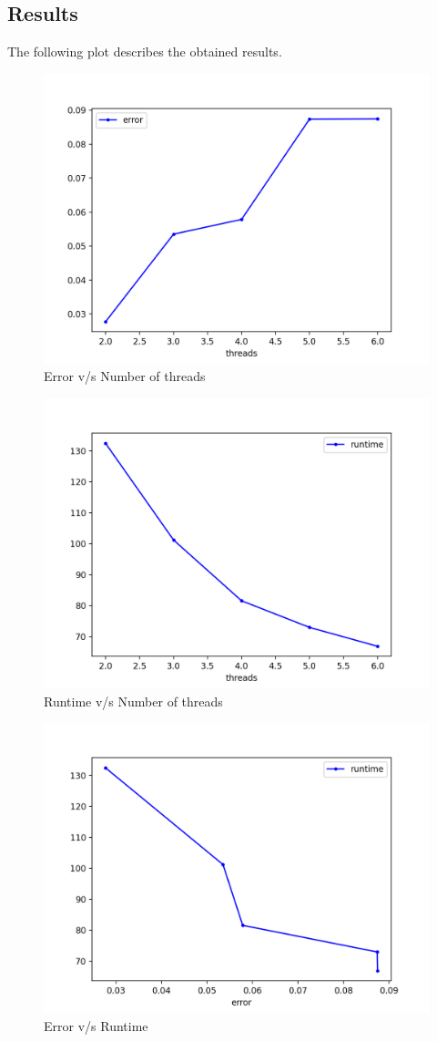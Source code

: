 \documentclass[a4paper]{article}
\begin{document}
\subsection*{Results}
The following plot describes the obtained results.
\begin{figure}[H]
    \centering
    \includegraphics[width=0.5\linewidth]{pthreads-spatial-dynamic-error.png}
    \caption{Error v/s Number of threads}
    \label{fig:pthreads-spatial-dynamic-error.png}
\end{figure}
\begin{figure}[H]
    \centering
    \includegraphics[width=0.5\linewidth]{spatial-pthreads-dynamic-runtime.png}
    \caption{Runtime v/s Number of threads}
    \label{fig:spatial-pthreads-dynamic-runtime.png}
\end{figure}
\begin{figure}[H]
    \centering
    \includegraphics[width=0.5\linewidth]{pthread-spatial-dynamic.png}
    \caption{Error v/s Runtime}
    \label{fig:pthread-spatial-dynamic.png}
\end{figure}
\end{document}
